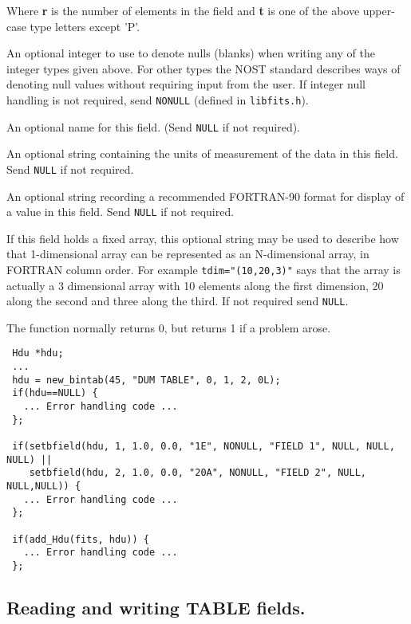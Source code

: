 \begin{arglist}
             Where {\bf r} is the number of elements in the field and
             {\bf t} is one of the above upper-case type letters
             except 'P'. 

 An optional integer to use to denote nulls (blanks) when
             writing any of the integer types given above. For other
             types the NOST standard describes ways of denoting null
             values without requiring input from the user. If integer
             null handling is not required, send \verb`NONULL` (defined
             in \verb`libfits.h`).

 An optional name for this field. (Send \verb`NULL` if not required). 

 An optional string containing the units of measurement
             of the data in this field. Send \verb`NULL` if not required.

 An optional string recording a recommended FORTRAN-90
             format for display of a value in this field. Send \verb`NULL`
             if not required.

 If this field holds a fixed array, this optional string
             may be used to describe how that 1-dimensional array
             can be represented as an N-dimensional array, in FORTRAN
             column order. For example \verb`tdim="(10,20,3)"` says that
             the array is actually a 3 dimensional array with 10
             elements along the first dimension, 20 along the second
             and three along the third. If not required send \verb`NULL`.
\end{arglist}

The function normally returns 0, but returns 1 if a problem arose.

\begin{verbatim}
 Hdu *hdu;
 ...
 hdu = new_bintab(45, "DUM TABLE", 0, 1, 2, 0L);
 if(hdu==NULL) {
   ... Error handling code ...
 };

 if(setbfield(hdu, 1, 1.0, 0.0, "1E", NONULL, "FIELD 1", NULL, NULL, NULL) ||
    setbfield(hdu, 2, 1.0, 0.0, "20A", NONULL, "FIELD 2", NULL, NULL,NULL)) {
   ... Error handling code ...
 };

 if(add_Hdu(fits, hdu)) {
   ... Error handling code ...
 };
\end{verbatim}

\subsection{Reading and writing TABLE fields.}

